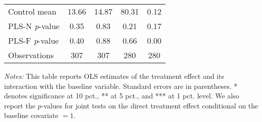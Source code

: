 \begin{table}[ht]
{\begin{threeparttable}
\begin{tabular}{l*{4}{c}}
Control mean    &    13.66         &    14.87         &    80.31         &     0.12         \\
PLS-N \emph{p}-value&     0.35         &     0.83         &     0.21         &     0.17         \\
PLS-F \emph{p}-value&     0.40         &     0.88         &     0.66         &     0.00         \\
Observations    &      307         &      307         &      280         &      280         \\
\bottomrule \end{tabular} \begin{tablenotes}[flushleft] \footnotesize \item \emph{Notes:} This table reports OLS estimates of the treatment effect and its interaction with the baseline variable. Standard errors are in parentheses. * denotes significance at 10 pct., ** at 5 pct., and *** at 1 pct. level. We also report the \(p\)-values for joint tests on the direct treatment effect conditional on the baseline covariate $= 1$. \end{tablenotes} \end{threeparttable} } \end{table}

